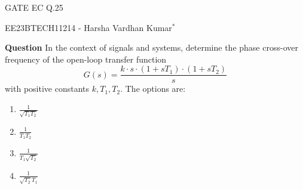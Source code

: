 \documentclass{article}
\begin{document}
\vspace{3cm}
\begin{center}
  \Huge{GATE EC Q.25}
\end{center}
\begin{center}
    \Large {EE23BTECH11214 - Harsha Vardhan Kumar$^{*}$%
}
\end{center}
\bigskip
\begin{paracol}{2}
\begin{leftcolumn}
\noindent
\textbf{Question}
In the context of signals and systems, determine the phase cross-over frequency of the open-loop transfer function
\[
G(s) = \frac{k \cdot s \cdot (1+sT_1) \cdot (1+sT_2)}{s}
\]
with positive constants $k, T_1, T_2$. The options are:
\begin{enumerate}[label=(\Alph*)]
\item $\frac{1}{\sqrt{T_1 T_2}}$
\item $\frac{1}{T_1 T_2}$
\item $\frac{1}{T_1\sqrt{T_2}}$
\item $\frac{1}{\sqrt{T_2}T_1}$
\end{enumerate}
\end{leftcolumn}
\end{paracol}
\end{document}
